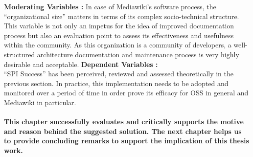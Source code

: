 \textbf{Moderating Variables : }
\newline\newline
\indent In case of Mediawiki's software process, the \enquote{organizational size} matters in terms of its complex socio-technical structure. This variable is not only an impetus for the idea of improved documentation process but also an evaluation point to assess its effectiveness and usefulness within the community. As this organization is a community of developers, a well-structured architecture documentation and maintenance process is very highly desirable and acceptable.
\newline
\newline
\indent\textbf{Dependent Variables : }
\newline \\\indent\enquote{SPI Success} has been perceived, reviewed and assessed theoretically in the previous section. In practice, this implementation needs to be adopted and monitored over a period of time in order prove its efficacy for OSS in general and Mediawiki in particular.


\paragraph{This chapter successfully evaluates and critically supports the motive and reason behind the suggested solution. The next chapter helps us to provide concluding remarks to support the implication of this thesis work.}
